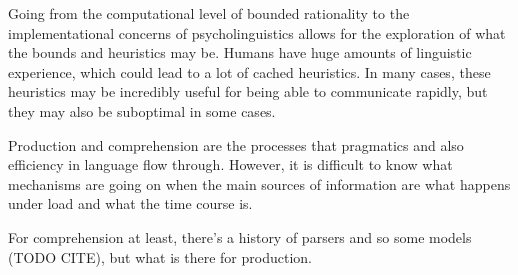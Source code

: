 \documentclass[]{article}
\begin{document}
Going from the computational level of bounded rationality to the implementational concerns of psycholinguistics allows for the exploration of what the bounds and heuristics may be. Humans have huge amounts of linguistic experience, which could lead to a lot of cached heuristics. In many cases, these heuristics may be incredibly useful for being able to communicate rapidly, but they may also be suboptimal in some cases. 

Production and comprehension are the processes that pragmatics and also efficiency in language flow through. However, it is difficult to know what mechanisms are going on when the main sources of information are what happens under load and what the time course is. 

For comprehension at least, there's a history of parsers and so some models (TODO CITE), but what is there for production. 





%
%
%
%
%
\end{document}
